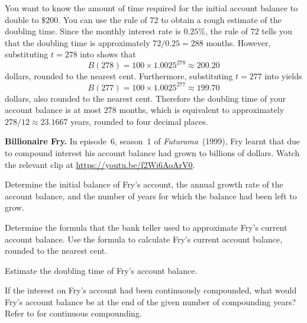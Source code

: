 \documentclass[a4paper,oneside,12pt]{article}
\begin{document}
{\begin{solution}
You want to know the amount of time required for the initial account
balance to double to $\$200$.  You can use the rule of $72$ to obtain
a rough estimate of the doubling time.  Since the monthly interest
rate is $0.25\%$, the rule of $72$ tells you that the doubling time is
approximately $72 / 0.25 = 288$ months.  However, substituting
$t = 278$ into  shows that
\[
B(278)
=
100 \times 1.0025^{278}
\approx
200.20
\]
dollars, rounded to the nearest cent.  Furthermore, substituting
$t = 277$ into  yields
\[
B(277)
=
100 \times 1.0025^{277}
\approx
199.70
\]
dollars, also rounded to the nearest cent.  Therefore the doubling
time of your account balance is at most $278$ months, which is
equivalent to approximately $278 / 12 \approx 23.1667$ years, rounded
to four decimal places.
\end{solution}
}{}

\begin{exercise}
\textbf{Billionaire Fry.}
In episode~6, season~1 of \emph{Futurama}~(1999), Fry learnt that due
to compound interest his account balance had grown to billions of
dollars.  Watch the relevant clip at
\url{https://youtu.be/f2Wi6AoArV0}.
\begin{packedenum}
\item\label{subex:exponential:Fry_initial_balance}
  Determine the initial balance of Fry's account, the annual growth
  rate of the account balance, and the number of years for which the
  balance had been left to grow.

\item\label{subex:exponential:Fry_formula}
  Determine the formula that the bank teller used to approximate Fry's
  current account balance.  Use the formula to calculate Fry's current
  account balance, rounded to the nearest cent.

\item\label{subex:exponential:Fry_doubling_time}
  Estimate the doubling time of Fry's account balance.

\item\label{subex:exponential:Fry_continuous_compounding}
  If the interest on Fry's account had been continuously compounded,
  what would Fry's account balance be at the end of the given number
  of compounding years?  Refer to 
  for continuous compounding.
\end{packedenum}
\end{exercise}
\end{document}
